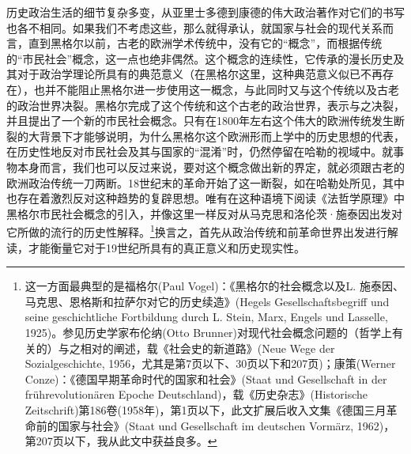 历史政治生活的细节复杂多变，从亚里士多德到康德的伟大政治著作对它们的书写也各不相同。如果我们不考虑这些，那么就得承认，就国家与社会的现代关系而言，直到黑格尔以前，古老的欧洲学术传统中，没有它的“概念”，而根据传统的“市民社会”概念，这一点也绝非偶然。这个概念的连续性，它传承的漫长历史及其对于政治学理论所具有的典范意义（在黑格尔这里，这种典范意义似已不再存在），也并不能阻止黑格尔进一步使用这一概念，与此同时又与这个传统以及古老的政治世界决裂。黑格尔完成了这个传统和这个古老的政治世界，表示与之决裂，并且提出了一个新的市民社会概念。只有在1800年左右这个伟大的欧洲传统发生断裂的大背景下才能够说明，为什么黑格尔这个欧洲形而上学中的历史思想的代表，在历史性地反对市民社会及其与国家的“混淆”时，仍然停留在哈勒的视域中。就事物本身而言，我们也可以反过来说，要对这个概念做出新的界定，就必须跟古老的欧洲政治传统一刀两断。18世纪末的革命开始了这一断裂，如在哈勒处所见，其中也存在着激烈反对这种趋势的复辟思想。唯有在这种语境下阅读《法哲学原理》中黑格尔市民社会概念的引入，并像这里一样反对从马克思和洛伦茨·施泰因出发对它所做的流行的历史性解释。\footnote{这一方面最典型的是福格尔(Paul Vogel)：《黑格尔的社会概念以及L. 施泰因、马克思、恩格斯和拉萨尔对它的历史续造》(Hegels Gesellschaftsbegriff und seine geschichtliche Fortbildung durch L. Stein, Marx, Engels und Lasselle, 1925)。参见历史学家布伦纳(Otto Brunner)对现代社会概念问题的（哲学上有关的）与之相对的阐述，载《社会史的新道路》(Neue Wege der Sozialgeschichte, 1956，尤其是第7页以下、30页以下和207页)；康策(Werner Conze)：《德国早期革命时代的国家和社会》(Staat und Gesellschaft in der frührevolutionären Epoche Deutschland)，载《历史杂志》(Historische Zeitschrift)第186卷(1958年)，第1页以下，此文扩展后收入文集《德国三月革命前的国家与社会》(Staat und Gesellschaft im deutschen Vormärz, 1962)，第207页以下，我从此文中获益良多。}换言之，首先从政治传统和前革命世界出发进行解读，才能衡量它对于19世纪所具有的真正意义和历史现实性。

